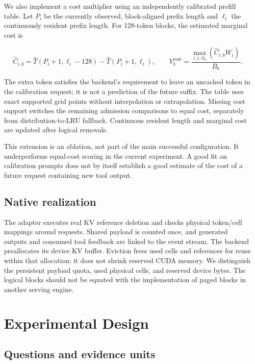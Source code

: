 \documentclass[sigconf, screen, review]{acmart}
\begin{document}
We also implement a cost multiplier using an independently calibrated
prefill table. Let \(P_i\) be the currently observed, block-aligned
prefix length and \(\ell_i\) the continuously resident prefix length.
For 128-token blocks, the estimated marginal cost is

\[
\widehat C_{i,b}=\widehat T(P_i+1,\ell_i-128)
 -\widehat T(P_i+1,\ell_i),
\qquad
V_b^{\mathrm{cost}}=\frac{\max_{i\in\mathcal O_b}
 (\widehat C_{i,b}W_i)}{B_b}.
\]

The extra token satisfies the backend's requirement to leave an uncached
token in the calibration request; it is not a prediction of the future
suffix. The table uses exact supported grid points without interpolation
or extrapolation. Missing cost support switches the remaining admission
comparisons to equal cost, separately from distribution-to-LRU fallback.
Continuous resident length and marginal cost are updated after logical
removals.

This extension is an ablation, not part of the main successful
configuration. It underperforms equal-cost scoring in the current
experiment. A good fit on calibration prompts does not by itself
establish a good estimate of the cost of a future request containing new
tool output.

\subsection{Native realization}\label{native-realization}

The adapter executes real KV reference deletion and checks physical
token/cell mappings around requests. Shared payload is counted once, and
generated outputs and consumed tool feedback are linked to the event
stream. The backend preallocates its device KV buffer. Eviction frees
used cells and references for reuse within that allocation; it does not
shrink reserved CUDA memory. We distinguish the persistent payload
quota, used physical cells, and reserved device bytes. The logical
blocks should not be equated with the implementation of paged blocks in
another serving engine.

\section{Experimental Design}\label{experimental-design}

\subsection{Questions and evidence
units}\label{questions-and-evidence-units}
\end{document}
